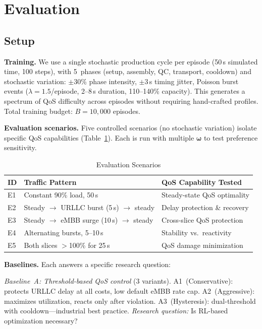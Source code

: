 \documentclass[conference]{IEEEtran}
\newcommand{\vomega}{\boldsymbol{\omega}}
\begin{document}
\section{Evaluation}\label{sec:eval}

\subsection{Setup}\label{sec:setup}

\textbf{Training.}
We use a single stochastic production cycle per episode (50\,s simulated time, 100 steps), with 5~phases (setup, assembly, QC, transport, cooldown) and stochastic variation: $\pm$30\% phase intensity, $\pm$3\,s timing jitter, Poisson burst events ($\lambda{=}1.5$/episode, 2--8\,s duration, 110--140\% capacity).
This generates a spectrum of QoS difficulty across episodes without requiring hand-crafted profiles.
Total training budget: $B{=}10{,}000$ episodes.

\textbf{Evaluation scenarios.}
Five controlled scenarios (no stochastic variation) isolate specific QoS capabilities (Table~\ref{tab:scenarios}).
Each is run with multiple $\vomega$ to test preference sensitivity.

\begin{table}[t]
\centering
\caption{Evaluation Scenarios}
\label{tab:scenarios}
\small
\begin{tabular}{@{}lp{3.2cm}p{3.0cm}@{}}
\toprule
\textbf{ID} & \textbf{Traffic Pattern} & \textbf{QoS Capability Tested} \\
\midrule
E1 & Constant 90\% load, 50\,s & Steady-state QoS optimality \\
E2 & Steady $\to$ URLLC burst (5\,s) $\to$ steady & Delay protection \& recovery \\
E3 & Steady $\to$ eMBB surge (10\,s) $\to$ steady & Cross-slice QoS protection \\
E4 & Alternating bursts, 5--10\,s & Stability vs.\ reactivity \\
E5 & Both slices $>$100\% for 25\,s & QoS damage minimization \\
\bottomrule
\end{tabular}
\end{table}

\textbf{Baselines.}
Each answers a specific research question:

\emph{Baseline~A: Threshold-based QoS control} (3 variants).
A1~(Conservative): protects URLLC delay at all costs, low default eMBB rate cap.
A2~(Aggressive): maximizes utilization, reacts only after violation.
A3~(Hysteresis): dual-threshold with cooldown---industrial best practice.
\emph{Research question:} Is RL-based optimization necessary?
\end{document}
